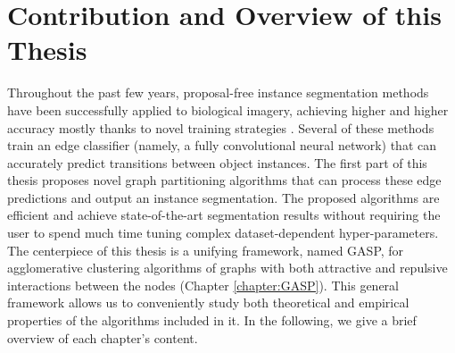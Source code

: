 \newpage
\section{Contribution and Overview of this Thesis}
Throughout the past few years, proposal-free instance segmentation methods have been successfully applied to biological imagery, achieving higher and higher accuracy mostly thanks to novel training strategies \cite{lee2017superhuman,milletari2016v}. 
Several of these methods train an edge classifier (namely, a fully convolutional neural network) that can accurately predict transitions between object instances. The first part of this thesis proposes novel graph partitioning algorithms that can process these edge predictions and output an instance segmentation. The proposed algorithms are efficient and achieve state-of-the-art segmentation results without requiring the user to spend much time tuning complex dataset-dependent hyper-parameters. The centerpiece of this thesis is a unifying framework, named GASP, for agglomerative clustering algorithms of graphs with both attractive and repulsive interactions between the nodes (Chapter \ref{chapter:GASP}). This general framework allows us to conveniently study both theoretical and empirical properties of the algorithms included in it. 
In the following, we give a brief overview of each chapter’s content.
\medskip

